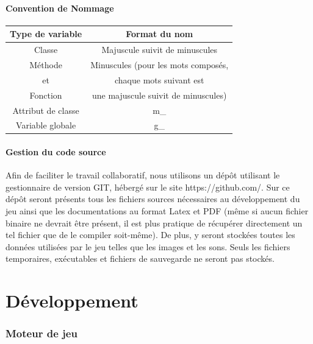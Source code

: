 \documentclass[a4paper]{article}
\newcommand{\alinea}{\hspace*{0.5cm}}
\begin{document}
      \subsection{Convention de Nommage}
        \begin{small}
          \begin{tabular}{| c | c |}
            \hline
            \textbf{Type de variable} & \textbf{Format du nom}\\
            \hline
            Classe & Majuscule suivit de minuscules\\
            \hline
            Méthode & Minuscules (pour les mots composés,\\
            et & chaque mots suivant est\\
            Fonction & une majuscule suivit de minuscules)\\
            \hline
            Attribut de classe & m\_\\
            \hline
            Variable globale & g\_\\
            \hline
          \end{tabular}
        \end{small}

      \subsection{Gestion du code source}
        \alinea Afin de faciliter le travail collaboratif, nous utilisons un dépôt utilisant le gestionnaire de version GIT, hébergé sur le site https://github.com/. Sur ce dépôt seront présents tous les fichiers sources nécessaires au développement du jeu ainsi que les documentations au format Latex et PDF (même si aucun fichier binaire ne devrait être présent, il est plus pratique de récupérer directement un tel fichier que de le compiler soit-même). De plus, y seront stockées toutes les données utilisées par le jeu telles que les images et les sons. Seuls les fichiers temporaires, exécutables et fichiers de sauvegarde ne seront pas stockés.
		

  \newpage
  \part{Développement}
  
    \section{Moteur de jeu}
    
\end{document}
